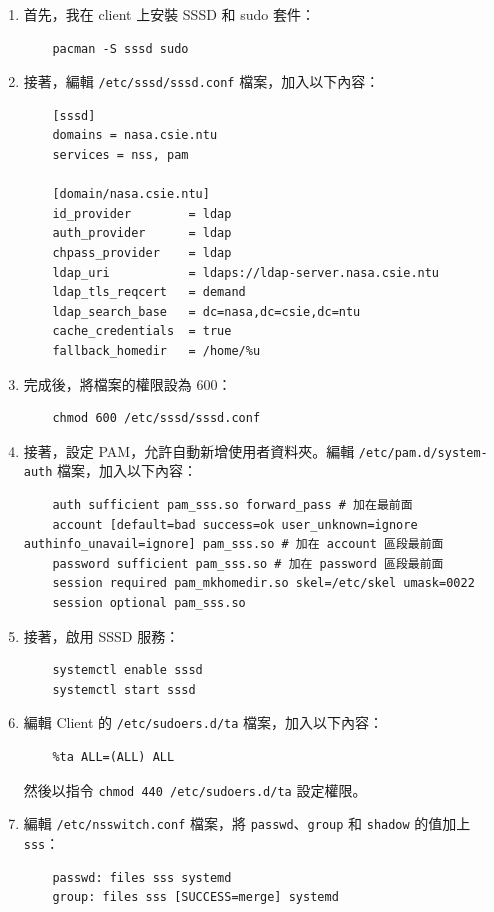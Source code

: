 \documentclass[12pt]{article}
\begin{document}
\begin{enumerate}
  \item 首先，我在 client 上安裝 SSSD 和 sudo 套件：
  \begin{verbatim}
    pacman -S sssd sudo
  \end{verbatim}
  \item 接著，編輯 \texttt{/etc/sssd/sssd.conf} 檔案，加入以下內容：
  \begin{verbatim}
    [sssd]
    domains = nasa.csie.ntu
    services = nss, pam

    [domain/nasa.csie.ntu]
    id_provider        = ldap
    auth_provider      = ldap
    chpass_provider    = ldap
    ldap_uri           = ldaps://ldap-server.nasa.csie.ntu
    ldap_tls_reqcert   = demand
    ldap_search_base   = dc=nasa,dc=csie,dc=ntu
    cache_credentials  = true
    fallback_homedir   = /home/%u
  \end{verbatim}
  \item 完成後，將檔案的權限設為 600：
  \begin{verbatim}
    chmod 600 /etc/sssd/sssd.conf
  \end{verbatim}
  \item 接著，設定 PAM，允許自動新增使用者資料夾。編輯 \texttt{/etc/pam.d/system-auth} 檔案，加入以下內容：
  \begin{verbatim}
    auth sufficient pam_sss.so forward_pass # 加在最前面
    account [default=bad success=ok user_unknown=ignore authinfo_unavail=ignore] pam_sss.so # 加在 account 區段最前面
    password sufficient pam_sss.so # 加在 password 區段最前面
    session required pam_mkhomedir.so skel=/etc/skel umask=0022
    session optional pam_sss.so
  \end{verbatim}
  \item 接著，啟用 SSSD 服務：
  \begin{verbatim}
    systemctl enable sssd
    systemctl start sssd
  \end{verbatim}
  \item 編輯 Client 的 \texttt{/etc/sudoers.d/ta} 檔案，加入以下內容：
  \begin{verbatim}
    %ta ALL=(ALL) ALL
  \end{verbatim}
  然後以指令 \texttt{chmod 440 /etc/sudoers.d/ta} 設定權限。
  \item 編輯 \texttt{/etc/nsswitch.conf} 檔案，將 \texttt{passwd}、\texttt{group} 和 \texttt{shadow} 的值加上 \texttt{sss}：
  \begin{verbatim}
    passwd: files sss systemd
    group: files sss [SUCCESS=merge] systemd

\end{verbatim}
\end{enumerate}
\end{document}
